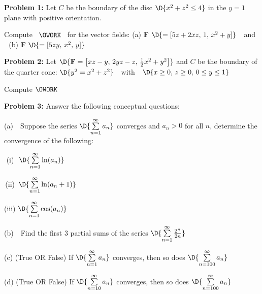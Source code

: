 \documentclass[12pt]{amsart}
\numberwithin{equation}{section}
\begin{document}
\vspace{1.0cm}

\thispagestyle{empty}
\newpage
\thispagestyle{empty}

{\bf Problem 1:} Let $C$ be the boundary of the disc $\D{x^2 + z^2 \le 4}$ in the $y = 1$ plane with positive orientation.  

\vspace{0.2cm}

Compute \, $\OWORK$ \, for the vector fields: (a) {\bf F} $\D{= [5z+2xz,\, 1,\, x^2+y]}$ \,\, and \,\, (b) {\bf F} $\D{= [5zy,\, x^2,\, y]}$

\thispagestyle{empty}
\newpage
\thispagestyle{empty}

{\bf Problem 2:} Let $\D{{\bf F} = \left[xz-y,\, 2yz-z,\, \frac{1}{2}x^2 + y^2\right]}$ and $C$ be the boundary of the quarter cone:
$\D{y^2 = x^2 + z^2}$ \,\, with \,\, $\D{ x \ge 0,\, z \ge 0,\,  0 \le y \le 1}$

\vspace{0.1cm}

Compute $\OWORK$

\thispagestyle{empty}
\newpage
\thispagestyle{empty}

{\bf Problem 3:} Answer the following conceptual questions:

(a) \,\, Suppose the series $\D{\sum \limits_{n=1}^{\infty} a_n}$ converges and $a_n > 0$ for all $n$, determine the  convergence of the following:

\vspace{0.1cm}

\quad \,\,(i)\,\, \quad $\D{\sum \limits_{n=1}^{\infty} \ln(a_n)}$

\vspace{1.6cm}

\quad \,(ii)\, \quad $\D{\sum \limits_{n=1}^{\infty} \ln(a_n + 1)}$

\vspace{1.6cm}

\quad (iii) \quad $\D{\sum \limits_{n=1}^{\infty} \cos(a_n)}$

\vspace{1.6cm}

(b) \,\, Find the first 3 partial sums of the series \quad $\D{\sum \limits_{n=1}^{\infty} \frac{2^n}{2n} }$ 

(c) (True OR False) \quad If $\D{\sum \limits_{n=1}^{\infty} a_n}$ converges, then so does $\D{\sum \limits_{n=100}^{\infty} a_n}$ 

(d) (True OR False) \quad If $\D{\sum \limits_{n=10}^{\infty} a_n}$ converges, then so does $\D{\sum \limits_{n=100}^{\infty} a_n}$ 
\end{document}
